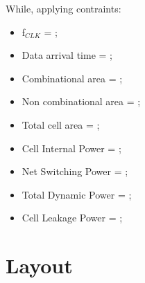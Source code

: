 While, applying contraints: 

\begin{itemize}
\item f$_{CLK}$ = ;\\
\item Data arrival time = ;\\
\item Combinational area = ;\\
\item Non combinational area = ;\\
\item Total cell area = ;\\
\item Cell Internal Power = ;\\
\item Net Switching Power = ;\\
\item Total Dynamic Power = ;\\
\item Cell Leakage Power = ;\\
\end{itemize}

\section{Layout}

